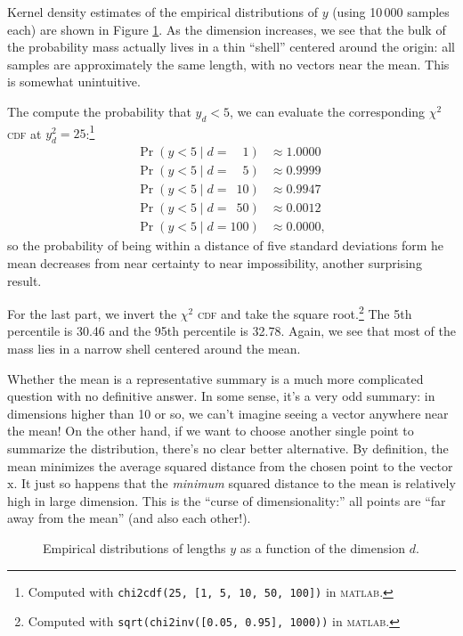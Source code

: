 \documentclass{article}
\newcommand{\acro}[1]{\textsc{\MakeLowercase{#1}}}
\newcommand{\given}{\mid}
\renewcommand{\vec}[1]{\bm{\mathrm{#1}}}
\begin{document}
Kernel density estimates of the empirical distributions of $y$ (using
10\,000 samples each) are shown in Figure \ref{problem_1}. As the
dimension increases, we see that the bulk of the probability mass
actually lives in a thin ``shell'' centered around the origin: all
samples are approximately the same length, with no vectors near the
mean.  This is somewhat unintuitive.

The compute the probability that $y_d < 5$, we can evaluate the
corresponding $\chi^2$ \acro{CDF} at $y_d^2 = 25$:\footnote{Computed
  with \texttt{chi2cdf(25, [1, 5, 10, 50, 100])} in \acro{MATLAB}.}
\begin{align*}
  \Pr(y < 5 \given d = \phantom{00}1) &\approx 1.0000 \\
  \Pr(y < 5 \given d = \phantom{00}5) &\approx 0.9999 \\
  \Pr(y < 5 \given d = \phantom{0}10) &\approx 0.9947 \\
  \Pr(y < 5 \given d = \phantom{0}50) &\approx 0.0012 \\
  \Pr(y < 5 \given d = 100) &\approx 0.0000,
\end{align*}
so the probability of being within a distance of five standard
deviations form he mean decreases from near certainty to near
impossibility, another surprising result.

For the last part, we invert the $\chi^2$ \acro{CDF} and take the
square root.\footnote{Computed with \texttt{sqrt(chi2inv([0.05, 0.95],
    1000))} in \acro{MATLAB}.}  The 5th percentile is 30.46 and the
95th percentile is 32.78.  Again, we see that most of the mass lies in
a narrow shell centered around the mean.

Whether the mean is a representative summary is a much more
complicated question with no definitive answer.  In some sense, it's a
very odd summary: in dimensions higher than 10 or so, we can't imagine
seeing a vector anywhere near the mean!  On the other hand, if we want
to choose another single point to summarize the distribution, there's
no clear better alternative.  By definition, the mean minimizes the
average squared distance from the chosen point to the vector
$\vec{x}$.  It just so happens that the \emph{minimum} squared
distance to the mean is relatively high in large dimension.  This is
the ``curse of dimensionality:'' all points are ``far away from the
mean'' (and also each other!).

\begin{figure}
  \centering
  
  \caption{Empirical distributions of lengths $y$ as a function of the
    dimension $d$.}
  \label{problem_1}
\end{figure}
\end{document}
